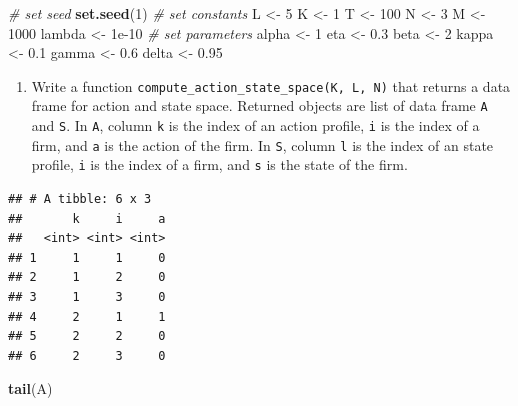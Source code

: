 \documentclass[]{book}
\newenvironment{Shaded}{\begin{snugshade}}{\end{snugshade}}
\newcommand{\KeywordTok}[1]{\textcolor[rgb]{0.13,0.29,0.53}{\textbf{#1}}}
\newcommand{\DecValTok}[1]{\textcolor[rgb]{0.00,0.00,0.81}{#1}}
\newcommand{\FloatTok}[1]{\textcolor[rgb]{0.00,0.00,0.81}{#1}}
\newcommand{\StringTok}[1]{\textcolor[rgb]{0.31,0.60,0.02}{#1}}
\newcommand{\CommentTok}[1]{\textcolor[rgb]{0.56,0.35,0.01}{\textit{#1}}}
\newcommand{\OperatorTok}[1]{\textcolor[rgb]{0.81,0.36,0.00}{\textbf{#1}}}
\newcommand{\NormalTok}[1]{#1}
\providecommand{\tightlist}{%
  \setlength{\itemsep}{0pt}\setlength{\parskip}{0pt}}
\begin{document}
\begin{Shaded}
\begin{Highlighting}[]
\CommentTok{# set seed}
\KeywordTok{set.seed}\NormalTok{(}\DecValTok{1}\NormalTok{)}
\CommentTok{# set constants }
\NormalTok{L <-}\StringTok{ }\DecValTok{5}
\NormalTok{K <-}\StringTok{ }\DecValTok{1}
\NormalTok{T <-}\StringTok{ }\DecValTok{100}
\NormalTok{N <-}\StringTok{ }\DecValTok{3}
\NormalTok{M <-}\StringTok{ }\DecValTok{1000}
\NormalTok{lambda <-}\StringTok{ }\FloatTok{1e-10}
\CommentTok{# set parameters}
\NormalTok{alpha <-}\StringTok{ }\DecValTok{1}
\NormalTok{eta <-}\StringTok{ }\FloatTok{0.3}
\NormalTok{beta <-}\StringTok{ }\DecValTok{2}
\NormalTok{kappa <-}\StringTok{ }\FloatTok{0.1}
\NormalTok{gamma <-}\StringTok{ }\FloatTok{0.6}
\NormalTok{delta <-}\StringTok{ }\FloatTok{0.95}
\end{Highlighting}
\end{Shaded}

\begin{enumerate}
\def\labelenumi{\arabic{enumi}.}
\setcounter{enumi}{1}
\tightlist
\item
  Write a function \texttt{compute\_action\_state\_space(K,\ L,\ N)}
  that returns a data frame for action and state space. Returned objects
  are list of data frame \texttt{A} and \texttt{S}. In \texttt{A},
  column \texttt{k} is the index of an action profile, \texttt{i} is the
  index of a firm, and \texttt{a} is the action of the firm. In
  \texttt{S}, column \texttt{l} is the index of an state profile,
  \texttt{i} is the index of a firm, and \texttt{s} is the state of the
  firm.
\end{enumerate}

\begin{Shaded}
\end{Shaded}

\begin{verbatim}
## # A tibble: 6 x 3
##       k     i     a
##   <int> <int> <int>
## 1     1     1     0
## 2     1     2     0
## 3     1     3     0
## 4     2     1     1
## 5     2     2     0
## 6     2     3     0
\end{verbatim}

\begin{Shaded}
\begin{Highlighting}[]
\KeywordTok{tail}\NormalTok{(A)}
\end{Highlighting}
\end{Shaded}
\end{document}
